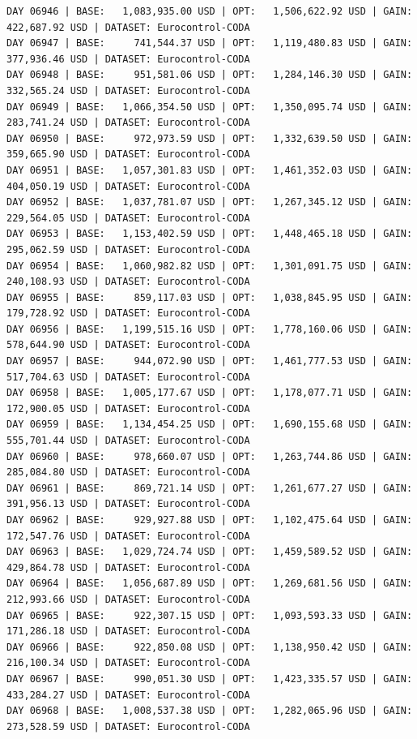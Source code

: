 \documentclass[11pt,a4paper]{article}
\begin{document}
\begin{verbatim}
DAY 06946 | BASE:   1,083,935.00 USD | OPT:   1,506,622.92 USD | GAIN: 422,687.92 USD | DATASET: Eurocontrol-CODA
DAY 06947 | BASE:     741,544.37 USD | OPT:   1,119,480.83 USD | GAIN: 377,936.46 USD | DATASET: Eurocontrol-CODA
DAY 06948 | BASE:     951,581.06 USD | OPT:   1,284,146.30 USD | GAIN: 332,565.24 USD | DATASET: Eurocontrol-CODA
DAY 06949 | BASE:   1,066,354.50 USD | OPT:   1,350,095.74 USD | GAIN: 283,741.24 USD | DATASET: Eurocontrol-CODA
DAY 06950 | BASE:     972,973.59 USD | OPT:   1,332,639.50 USD | GAIN: 359,665.90 USD | DATASET: Eurocontrol-CODA
DAY 06951 | BASE:   1,057,301.83 USD | OPT:   1,461,352.03 USD | GAIN: 404,050.19 USD | DATASET: Eurocontrol-CODA
DAY 06952 | BASE:   1,037,781.07 USD | OPT:   1,267,345.12 USD | GAIN: 229,564.05 USD | DATASET: Eurocontrol-CODA
DAY 06953 | BASE:   1,153,402.59 USD | OPT:   1,448,465.18 USD | GAIN: 295,062.59 USD | DATASET: Eurocontrol-CODA
DAY 06954 | BASE:   1,060,982.82 USD | OPT:   1,301,091.75 USD | GAIN: 240,108.93 USD | DATASET: Eurocontrol-CODA
DAY 06955 | BASE:     859,117.03 USD | OPT:   1,038,845.95 USD | GAIN: 179,728.92 USD | DATASET: Eurocontrol-CODA
DAY 06956 | BASE:   1,199,515.16 USD | OPT:   1,778,160.06 USD | GAIN: 578,644.90 USD | DATASET: Eurocontrol-CODA
DAY 06957 | BASE:     944,072.90 USD | OPT:   1,461,777.53 USD | GAIN: 517,704.63 USD | DATASET: Eurocontrol-CODA
DAY 06958 | BASE:   1,005,177.67 USD | OPT:   1,178,077.71 USD | GAIN: 172,900.05 USD | DATASET: Eurocontrol-CODA
DAY 06959 | BASE:   1,134,454.25 USD | OPT:   1,690,155.68 USD | GAIN: 555,701.44 USD | DATASET: Eurocontrol-CODA
DAY 06960 | BASE:     978,660.07 USD | OPT:   1,263,744.86 USD | GAIN: 285,084.80 USD | DATASET: Eurocontrol-CODA
DAY 06961 | BASE:     869,721.14 USD | OPT:   1,261,677.27 USD | GAIN: 391,956.13 USD | DATASET: Eurocontrol-CODA
DAY 06962 | BASE:     929,927.88 USD | OPT:   1,102,475.64 USD | GAIN: 172,547.76 USD | DATASET: Eurocontrol-CODA
DAY 06963 | BASE:   1,029,724.74 USD | OPT:   1,459,589.52 USD | GAIN: 429,864.78 USD | DATASET: Eurocontrol-CODA
DAY 06964 | BASE:   1,056,687.89 USD | OPT:   1,269,681.56 USD | GAIN: 212,993.66 USD | DATASET: Eurocontrol-CODA
DAY 06965 | BASE:     922,307.15 USD | OPT:   1,093,593.33 USD | GAIN: 171,286.18 USD | DATASET: Eurocontrol-CODA
DAY 06966 | BASE:     922,850.08 USD | OPT:   1,138,950.42 USD | GAIN: 216,100.34 USD | DATASET: Eurocontrol-CODA
DAY 06967 | BASE:     990,051.30 USD | OPT:   1,423,335.57 USD | GAIN: 433,284.27 USD | DATASET: Eurocontrol-CODA
DAY 06968 | BASE:   1,008,537.38 USD | OPT:   1,282,065.96 USD | GAIN: 273,528.59 USD | DATASET: Eurocontrol-CODA

\end{verbatim}
\end{document}
